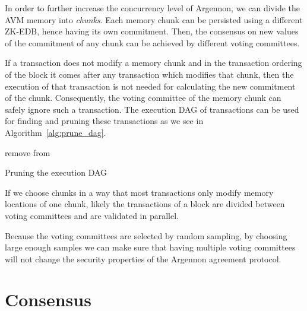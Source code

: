 \documentclass[11pt, A4]{report}
\begin{document}
    In order to further increase the concurrency level of Argennon, we can divide the AVM memory into \emph{chunks}.
    Each memory chunk can be persisted using a different ZK-EDB, hence having its own commitment. Then, the
    consensus on new values of the commitment of any chunk can be achieved by different voting committees.

    If a transaction does not modify a memory chunk and in the transaction ordering of the block it comes after
    any transaction which modifies that chunk, then the execution of that transaction is not needed for calculating
    the new commitment of the chunk. Consequently, the voting committee of the memory chunk can safely ignore such a
    transaction. The execution DAG of transactions can be used for finding and pruning these transactions as
    we see in Algorithm~\ref{alg:prune_dag}.

    \begin{algorithm}
        \DontPrintSemicolon
        \BlankLine
        {
            \RPrune{\V}\;
        }
        \BlankLine
        \Fn{\RPrune{\V}}
        {
            {
                remove \V from \Graph\;
                {
                    \;
                }
            }
        }
        \caption{Pruning the execution DAG}\label{alg:prune_dag}
    \end{algorithm}

    If we choose chunks in a way that most transactions only modify memory locations of one chunk,
    likely the transactions of a block are divided between voting committees and are validated in parallel.

    Because the voting committees are selected by random sampling, by choosing large enough samples we can make sure
    that having multiple voting committees will not change the security properties of the Argennon agreement protocol.

    \section{Consensus}\label{sec:consensus}
\end{document}
